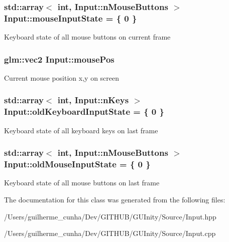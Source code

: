 \subsubsection[{mouse\+Input\+State}]{\setlength{\rightskip}{0pt plus 5cm}std\+::array$<$ int, Input\+::n\+Mouse\+Buttons $>$ Input\+::mouse\+Input\+State = \{ 0 \}\hspace{0.3cm}{\ttfamily [static]}}\label{class_input_afd2b6ea6a62a21bb5af4d5d7688b9509}
Keyboard state of all mouse buttons on current frame \hypertarget{class_input_a8a4e33aea3c586f5f327c51aed20e33e}{}
\subsubsection[{mouse\+Pos}]{\setlength{\rightskip}{0pt plus 5cm}glm\+::vec2 Input\+::mouse\+Pos\hspace{0.3cm}{\ttfamily [static]}}\label{class_input_a8a4e33aea3c586f5f327c51aed20e33e}
Current mouse position x,y on screen \hypertarget{class_input_ad6f01906250d4f81f5d75ec3adfef210}{}
\subsubsection[{old\+Keyboard\+Input\+State}]{\setlength{\rightskip}{0pt plus 5cm}std\+::array$<$ int, Input\+::n\+Keys $>$ Input\+::old\+Keyboard\+Input\+State = \{ 0 \}\hspace{0.3cm}{\ttfamily [static]}}\label{class_input_ad6f01906250d4f81f5d75ec3adfef210}
Keyboard state of all keyboard keys on last frame \hypertarget{class_input_a3b5a18a878d9c36cf3f27b30cfb1fce4}{}
\subsubsection[{old\+Mouse\+Input\+State}]{\setlength{\rightskip}{0pt plus 5cm}std\+::array$<$ int, Input\+::n\+Mouse\+Buttons $>$ Input\+::old\+Mouse\+Input\+State = \{ 0 \}\hspace{0.3cm}{\ttfamily [static]}}\label{class_input_a3b5a18a878d9c36cf3f27b30cfb1fce4}
Keyboard state of all mouse buttons on last frame 

The documentation for this class was generated from the following files\+:\begin{DoxyCompactItemize}
\item 
/\+Users/guilherme\+\_\+cunha/\+Dev/\+G\+I\+T\+H\+U\+B/\+G\+U\+Inity/\+Source/Input.\+hpp\item 
/\+Users/guilherme\+\_\+cunha/\+Dev/\+G\+I\+T\+H\+U\+B/\+G\+U\+Inity/\+Source/Input.\+cpp\end{DoxyCompactItemize}
